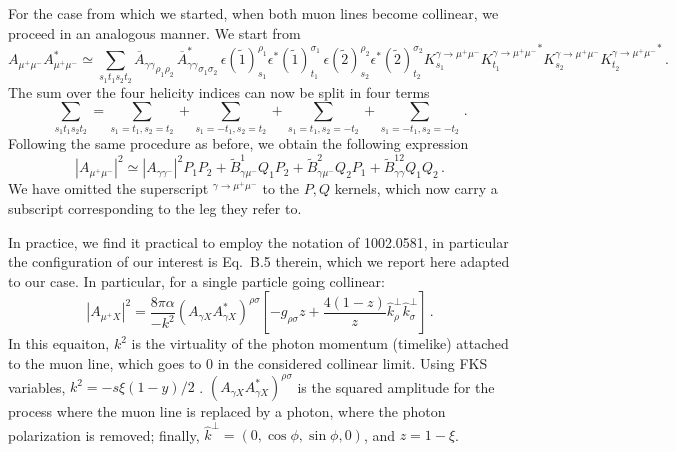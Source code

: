 \documentclass[a4paper,10pt]{article}
\begin{document}
For the case from which we started, when both muon lines become collinear, we proceed in an analogous manner. We start from
\begin{equation}
    A_{\mu^+ \mu^-} A_{\mu^+ \mu^-}^* \simeq 
    \sum_{s_1 t_1 s_2 t_2} {\overline A_{\gamma\gamma} }_{\rho_1 \rho_2}\,  {\overline A^*_{\gamma\gamma} }_{\sigma_1\sigma_2} 
    \, \epsilon(\tilde 1)^{\rho_1}_{s_1}  \epsilon^*(\tilde 1)^{\sigma_1}_{t_1}
    \, \epsilon(\tilde 2)^{\rho_2}_{s_2}  \epsilon^*(\tilde 2)^{\sigma_2}_{t_2}
    K^{\gamma\to\mu^+\mu^-}_{s_1} {K^{\gamma\to\mu^+\mu^-}_{t_1}}^*
    K^{\gamma\to\mu^+\mu^-}_{s_2} {K^{\gamma\to\mu^+\mu^-}_{t_2}}^*\,.
\end{equation}
The sum over the four helicity indices can now be split in four terms
\begin{equation}
 \sum_{s_1 t_1 s_2 t_2} =  \sum_{s_1= t_1, s_2=t_2} + \sum_{s_1=-t_1, s_2=t_2} +\sum_{s_1= t_1, s_2=-t_2} + \sum_{s_1=-t_1, s_2=-t_2}\,.
\end{equation}
Following the same procedure as before, we obtain the following expression
\begin{equation}
  |A_{\mu^+ \mu^-} |^2 \simeq  |A_{\gamma \gamma^-} |^2 P_1 P_2  +  
                          \tilde B^1_{\gamma \mu^-}  Q_1 P_2 +
                          \tilde B^2_{\gamma \mu^-}  Q_2 P_1 +
                          \tilde B^{12}_{\gamma \gamma}  Q_1 Q_2\, .
                          \label{eq:doublecoll}
\end{equation}
We have omitted the superscript ${ }^{\gamma\to\mu^+\mu^-}$ to the $P,Q$ kernels, which now carry a subscript corresponding to the leg they refer to.

In practice, we find it practical to employ the notation of 1002.0581, in particular the configuration of our interest is Eq.~B.5 therein, which we report
here adapted to our case. In particular, for a single particle going collinear:
\begin{equation}
    |  A_{\mu^+ X} |^2= \frac{8\pi\alpha}{-k^2}\left(A_{\gamma X}A_{\gamma X}^* \right)^{\rho\sigma}\left[- g_{\rho\sigma} z + \frac{4(1-z)}{z} \hat k^\perp_\rho \hat k^\perp_\sigma\right]\,.
    \label{eq:collpwg}
\end{equation}
In this equaiton, $k^2$ is the virtuality of the photon momentum (timelike) attached to the muon line, which goes to 0 in the considered collinear limit. Using
FKS variables,  $k^2=-s \xi (1-y)/2$ .
$\left(A_{\gamma X}A_{\gamma X}^* \right)^{\rho\sigma}$ is the squared amplitude for the process where the muon line is replaced by a photon, where the photon polarization is removed; finally, $\hat k^\perp = \left(0,\cos \phi, \sin \phi,0\right)$, and $z=1-\xi$. 
\end{document}
